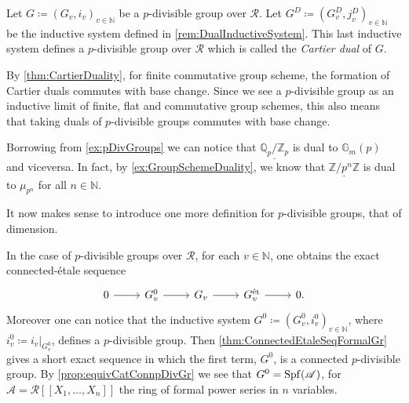 \begin{defn}
	Let $G \coloneqq \left( G_v, i_v \right)_{v \in \mathbb{N}}$
	be a $p$-divisible group over $\mathscr{R}$.
	Let $G^D \coloneqq \left( G_v^D, j_v^D \right)_{v \in \mathbb{N}}$ be the inductive system
	defined in \cref{rem:DualInductiveSystem}.
	This last inductive system defines a $p$-divisible group over $\mathscr{R}$
	which is called the \emph{Cartier dual} of $G$.
\end{defn}


\begin{rem}[]\label{rem:pDivDualityBaseChange}
	By \cref{thm:CartierDuality}, for finite commutative group scheme, the formation
	of Cartier duals commutes with base change.
	Since we see a $p$-divisible group as an inductive limit of finite, flat and commutative
	group schemes, this also means that taking duals of $p$-divisible groups
	commutes with base change.
\end{rem}


\begin{ex}[]
	Borrowing from \cref{ex:pDivGroups} we can notice that
	$\underline{\mathbb{Q}_p/\mathbb{Z}_{p}}$ is dual to $\mathbb{G}_m(p)$
	and viceversa.
	In fact, by \cref{ex:GroupSchemeDuality}, we know that
	$\underline{\mathbb{Z}/p^n\mathbb{Z}}$ is dual to $\mu_{p^n}$ for all $n \in \mathbb{N}$.
\end{ex}


\noindent
It now makes sense to introduce one more definition for $p$-divisible
groups, that of dimension.
\begin{rem}[]\label{rem:ConnectedComponentpDivGroup}
	In the case of $p$-divisible groups over $\mathscr{R}$, for each $v \in \mathbb{N}$, one obtains
	the exact connected-étale sequence
	\begin{equation*}
	\begin{tikzcd}
		0 \arrow[r, "", rightarrow] &
		G^0_v \arrow[r, "", rightarrow] &
		G_v \arrow[r, "", rightarrow] &
		G^{\mathrm{\acute et}}_v \arrow[r, "", rightarrow] &
		0
	.\end{tikzcd}
	\end{equation*}
	Moreover one can notice that the inductive system 
	$G^0 \coloneqq \left( G^0_v, i^0_v \right)_{v \in \mathbb{N}}$,
	where $i^0_v \coloneqq \left.i_v\right|_{G^0_v}$, defines a $p$-divisible group.
	Then \cref{thm:ConnectedEtaleSeqFormalGr} gives a short exact sequence
	in which the first term, $G^0$, is a connected $p$-divisible group.
	By \cref{prop:equivCatConnpDivGr} we see that $G^0 = \operatorname{Spf}(\mathscr{A})$,
	for $\mathscr{A} = \mathscr{R} [\![ X_1, \ldots, X_{ n } ]\!]$ the ring of 
	formal power series in $n$ variables.
\end{rem}


